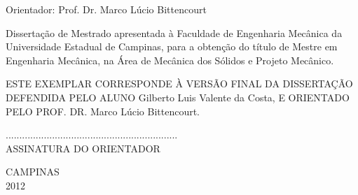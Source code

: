 \vspace{0.7cm}
\noindent
Orientador: Prof. Dr. Marco Lúcio Bittencourt\\
\vspace{0.5cm}

\vspace{0.1cm}
Dissertação de Mestrado apresentada à Faculdade de Engenharia Mecânica da Universidade Estadual de
Campinas, para a obtenção do título de Mestre em Engenharia Mecânica, na Área de Mecânica dos
Sólidos e Projeto Mecânico.

\vspace{0.4cm}
\begin{flushleft}
\parbox{4in}{ESTE EXEMPLAR CORRESPONDE À VERSÃO FINAL DA DISSERTAÇÃO DEFENDIDA PELO ALUNO
Gilberto Luis Valente da Costa, E
ORIENTADO PELO PROF. DR.
Marco Lúcio Bittencourt.\\
\begin{center}
...............................................................\\
ASSINATURA DO ORIENTADOR
\end{center}
}
\end{flushleft}

\vspace{0.4cm}
\begin{center}
CAMPINAS\\ 2012
\end{center}

